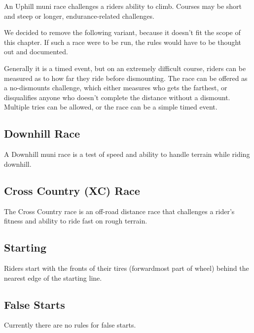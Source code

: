 An Uphill muni race challenges a riders ability to climb.
Courses may be short and steep or longer, endurance-related challenges. 

\begin{comment2016}
We decided to remove the following variant, because it doesn't fit the
scope of this chapter.  If such a race were to be run,
the rules would have to be thought out and documented.

Generally it is a timed event, but on an extremely difficult course, riders can be measured as to how far they ride before dismounting.
The race can be offered as a no-dismounts challenge, which either measures who gets the farthest, or disqualifies anyone who doesn't complete the distance without a dismount.
Multiple tries can be allowed, or the race can be a simple timed event.
\end{comment2016}

\subsection{Downhill Race \label{sec:muni_downhill}}

A Downhill muni race is a test of speed and ability to handle terrain while riding downhill.

\subsection{Cross Country (XC) Race\label{sec:muni_xc}}

The Cross Country race is an off-road distance race that challenges a rider's fitness and ability to ride fast on rough terrain.

\subsection{Starting}

Riders start with the fronts of their tires (forwardmost part of wheel) behind the nearest edge of the starting line.

\begin{comment2016}
\subsection{False Starts}

Currently there are no rules for false starts.
\end{comment2016}

